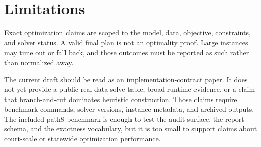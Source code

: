 \section{Limitations}

Exact optimization claims are scoped to the model, data, objective, constraints,
and solver status. A valid final plan is not an optimality proof. Large
instances may time out or fall back, and those outcomes must be reported as
such rather than normalized away.

The current draft should be read as an implementation-contract paper. It does
not yet provide a public real-data solve table, broad runtime evidence, or a
claim that branch-and-cut dominates heuristic construction. Those claims require
benchmark commands, solver versions, instance metadata, and archived outputs.
The included path8 benchmark is enough to test the audit surface, the report
schema, and the exactness vocabulary, but it is too small to support claims
about court-scale or statewide optimization performance.
